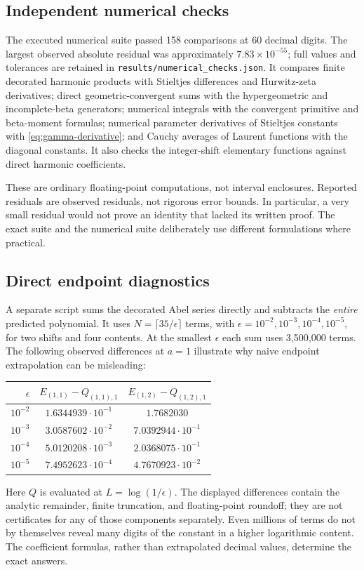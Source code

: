 \documentclass[11pt,oneside]{article}
\numberwithin{equation}{section}
\theoremstyle{definition}
\theoremstyle{remark}
\newcommand{\src}[1]{\nolinkurl{#1}}
\begin{document}
\subsection{Independent numerical checks}

The executed numerical suite passed 158 comparisons at 60 decimal digits.
The largest observed absolute residual was approximately
$7.83\times10^{-55}$; full values and tolerances are retained in
\src{results/numerical_checks.json}. It compares finite decorated
harmonic products with Stieltjes differences and Hurwitz-zeta derivatives;
direct geometric-convergent sums with the hypergeometric and incomplete-beta
generators; numerical integrals with the convergent primitive and beta-moment
formulas; numerical parameter derivatives of Stieltjes constants with
\eqref{eq:gamma-derivative}; and Cauchy averages of Laurent functions with the
diagonal constants. It also checks the integer-shift elementary functions
against direct harmonic coefficients.

These are ordinary floating-point computations, not interval enclosures.
Reported residuals are observed residuals, not rigorous error bounds. In
particular, a very small residual would not prove an identity that lacked
its written proof. The exact suite and the numerical suite deliberately use
different formulations where practical.

\subsection{Direct endpoint diagnostics}

A separate script sums the decorated Abel series directly and subtracts the
\emph{entire} predicted polynomial. It uses $N=\lceil35/\epsilon\rceil$ terms,
with $\epsilon=10^{-2},10^{-3},10^{-4},10^{-5}$, for two shifts and four
contents. At the smallest $\epsilon$ each sum uses 3,500,000 terms.
The following observed differences at $a=1$ illustrate why naive endpoint
extrapolation can be misleading:
\begin{center}
\begin{tabular}{rcc}
\toprule
$\epsilon$ & $E_{(1,1)}-Q_{(1,1),1}$ & $E_{(1,2)}-Q_{(1,2),1}$\\
\midrule
$10^{-2}$ & $1.6344939\cdot10^{-1}$ & $1.7682030$\\
$10^{-3}$ & $3.0587602\cdot10^{-2}$ & $7.0392944\cdot10^{-1}$\\
$10^{-4}$ & $5.0120208\cdot10^{-3}$ & $2.0368075\cdot10^{-1}$\\
$10^{-5}$ & $7.4952623\cdot10^{-4}$ & $4.7670923\cdot10^{-2}$\\
\bottomrule
\end{tabular}
\end{center}
Here $Q$ is evaluated at $L=\log(1/\epsilon)$. The displayed differences
contain the analytic remainder, finite truncation, and floating-point
roundoff; they are not certificates for any of those components separately.
Even millions of terms do not by themselves reveal many digits of the
constant in a higher logarithmic content. The coefficient formulas, rather
than extrapolated decimal values, determine the exact answers.
\end{document}
